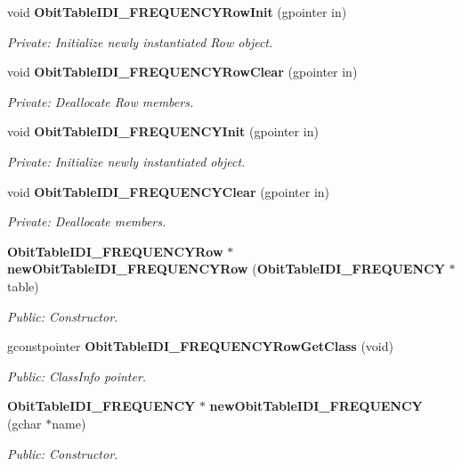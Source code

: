 \begin{CompactItemize}
\item 
void {\bf Obit\-Table\-IDI\_\-FREQUENCYRow\-Init} (gpointer in)
\begin{CompactList}\small\item\em Private: Initialize newly instantiated Row object. \item\end{CompactList}\item 
void {\bf Obit\-Table\-IDI\_\-FREQUENCYRow\-Clear} (gpointer in)
\begin{CompactList}\small\item\em Private: Deallocate Row members. \item\end{CompactList}\item 
void {\bf Obit\-Table\-IDI\_\-FREQUENCYInit} (gpointer in)
\begin{CompactList}\small\item\em Private: Initialize newly instantiated object. \item\end{CompactList}\item 
void {\bf Obit\-Table\-IDI\_\-FREQUENCYClear} (gpointer in)
\begin{CompactList}\small\item\em Private: Deallocate members. \item\end{CompactList}\item 
{\bf Obit\-Table\-IDI\_\-FREQUENCYRow} $\ast$ {\bf new\-Obit\-Table\-IDI\_\-FREQUENCYRow} ({\bf Obit\-Table\-IDI\_\-FREQUENCY} $\ast$table)
\begin{CompactList}\small\item\em Public: Constructor. \item\end{CompactList}\item 
gconstpointer {\bf Obit\-Table\-IDI\_\-FREQUENCYRow\-Get\-Class} (void)
\begin{CompactList}\small\item\em Public: Class\-Info pointer. \item\end{CompactList}\item 
{\bf Obit\-Table\-IDI\_\-FREQUENCY} $\ast$ {\bf new\-Obit\-Table\-IDI\_\-FREQUENCY} (gchar $\ast$name)
\begin{CompactList}\small\item\em Public: Constructor. \item\end{CompactList}\item 

\end{CompactItemize}
